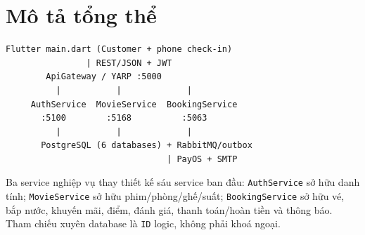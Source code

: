 \clearpage
\section{Mô tả tổng thể}\label{sec:srs-4}
\begin{Verbatim}
Flutter main.dart (Customer + phone check-in)
                | REST/JSON + JWT
        ApiGateway / YARP :5000
          |           |             |
     AuthService  MovieService  BookingService
       :5100        :5168          :5063
          |           |             |
       PostgreSQL (6 databases) + RabbitMQ/outbox
                                | PayOS + SMTP
\end{Verbatim}
Ba service nghiệp vụ thay thiết kế sáu service ban đầu: \texttt{Auth\allowbreak{}Service} sở hữu danh tính; \texttt{Movie\allowbreak{}Service} sở hữu phim/\allowbreak{}phòng/\allowbreak{}ghế/\allowbreak{}suất; \texttt{Booking\allowbreak{}Service} sở hữu vé, bắp nước, khuyến mãi, điểm, đánh giá, thanh toán/\allowbreak{}hoàn tiền và thông báo. Tham chiếu xuyên database là \texttt{ID} logic, không phải khoá ngoại.
